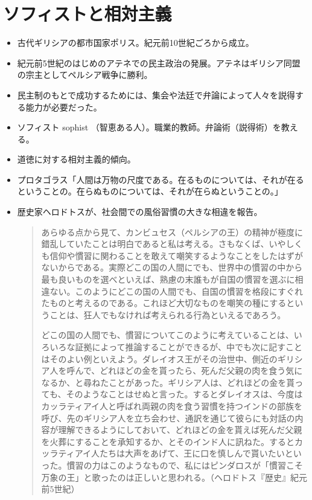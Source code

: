 \documentclass[uplatex]{bxjsarticle}
\begin{document}
\section{ソフィストと相対主義}


\begin{itemize}


\item 古代ギリシアの都市国家ポリス。紀元前10世紀ごろから成立。
\item 紀元前5世紀のはじめのアテネでの民主政治の発展。アテネはギリシア同盟の宗主としてペルシア戦争に勝利。

\item 民主制のもとで成功するためには、集会や法廷で弁論によって人々を説得する能力が必要だった。

\item ソフィスト sophist （智恵ある人）。職業的教師。弁論術（説得術）を教える。

\item 道徳に対する相対主義的傾向。
\item プロタゴラス「人間は万物の尺度である。在るものについては、それが在るということの。在らぬものについては、それが在らぬということの。」

\item 歴史家ヘロドトスが、社会間での風俗習慣の大きな相違を報告。

\begin{quotation}
  \small あらゆる点から見て、カンビュセス（ペルシアの王）の精神が極度に錯乱していたことは明白であると私は考える。さもなくば、いやしくも信仰や慣習に関わることを敢えて嘲笑するようなことをしたはずがないからである。実際どこの国の人間にでも、世界中の慣習の中から最も良いものを選べといえば、熟慮の末誰もが自国の慣習を選ぶに相違ない。このようにどこの国の人間でも、自国の慣習を格段にすぐれたものと考えるのである。これほど大切なものを嘲笑の種にするということは、狂人でもなければ考えられる行為といえるであろう。

  どこの国の人間でも、慣習についてこのように考えていることは、いろいろな証拠によって推論することができるが、中でも次に記すことはそのよい例といえよう。ダレイオス王がその治世中、側近のギリシア人を呼んで、どれほどの金を貰ったら、死んだ父親の肉を食う気になるか、と尋ねたことがあった。ギリシア人は、どれほどの金を貰っても、そのようなことはせぬと言った。するとダレイオスは、今度はカッラティアイ人と呼ばれ両親の肉を食う習慣を持つインドの部族を呼び、先のギリシア人を立ち会わせ、通訳を通じて彼らにも対話の内容が理解できるようにしておいて、どれほどの金を貰えば死んだ父親を火葬にすることを承知するか、とそのインド人に訊ねた。するとカッラティアイ人たちは大声をあげて、王に口を慎しんで貰いたいといった。慣習の力はこのようなもので、私にはピンダロスが「慣習こそ万象の王」と歌ったのは正しいと思われる。（ヘロドトス『歴史』紀元前5世紀）
\end{quotation}



\end{itemize}
\end{document}
